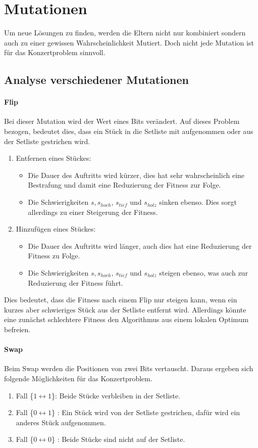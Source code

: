 \section{Mutationen}\label{sec:mutation}
Um neue Lösungen zu finden, werden die Eltern nicht nur kombiniert sondern auch zu
einer gewissen Wahrscheinlichkeit Mutiert. Doch nicht jede Mutation ist für das Konzertproblem 
sinnvoll. 
\subsection{Analyse verschiedener Mutationen}
\paragraph{Flip}
Bei dieser Mutation wird der Wert eines Bits verändert. Auf dieses Problem bezogen, 
bedeutet dies, dass ein Stück in die Setliste mit aufgenommen oder aus 
der Setliste gestrichen wird. 
\begin{enumerate}
    \item Entfernen eines Stückes: 
    \begin{itemize}
        \item Die Dauer des Auftritts wird kürzer, dies hat sehr wahrscheinlich eine Bestrafung und 
            damit eine Reduzierung der Fitness zur Folge. 
        \item Die Schwierigkeiten $s, s_{hoch}$, $ s_{tief}$ und $s_{holz}$ sinken ebenso. Dies sorgt allerdings 
            zu einer Steigerung der Fitness. 
    \end{itemize}
    \item Hinzufügen eines Stückes:
    \begin{itemize}
        \item Die Dauer des Auftritts wird länger, auch dies hat eine Reduzierung der Fitness zu Folge.
        \item Die Schwierigkeiten $s, s_{hoch}$, $ s_{tief}$ und $s_{holz}$ steigen ebenso, was auch zur Reduzierung 
            der Fitness führt. 
    \end{itemize}
\end{enumerate}
Dies bedeutet, dass die Fitness nach einem Flip nur steigen kann, wenn ein kurzes aber schwieriges Stück aus 
der Setliste entfernt wird. Allerdings könnte eine zunächst schlechtere Fitness den Algorithmus aus 
einem lokalen Optimum befreien.

\paragraph{Swap}
Beim Swap werden die Positionen von zwei Bits vertauscht. 
Daraus ergeben sich folgende Möglichkeiten für das Konzertproblem. 
\begin{enumerate}
    \item Fall \{$1 \longleftrightarrow 1$\}: Beide Stücke verbleiben in der Setliste.
    \item Fall \{$0 \longleftrightarrow 1$\} : Ein Stück wird von der Setliste gestrichen, dafür wird ein anderes Stück aufgenommen.
    \item Fall \{$0 \longleftrightarrow 0$\} : Beide Stücke sind nicht auf der Setliste.
\end{enumerate}

